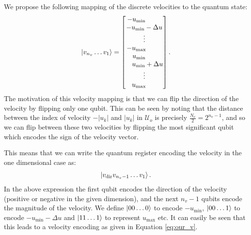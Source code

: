We propose the following mapping of the discrete velocities to the quantum state:
\begin{align}
\ket{v_{n_v} \dots v_1} = 
    \begin{bmatrix}
    -u_{\min} \phantom{\, -\Delta u}\\
    -u_{\min} -\Delta u\\
    \vdots \\
    -u_{\max} \phantom{\, -\Delta u}\\
    \phantom{-}u_{\min} \phantom{\, -\Delta u}\\
    \phantom{\,-}u_{\min} +\Delta u  \\
    \vdots \\
    \phantom{-}u_{\max} \phantom{\, +\Delta u}\\
    \end{bmatrix}.\label{eq:our_v}
\end{align}
The motivation of this velocity mapping is that we can flip the direction of the velocity by flipping only one qubit. This can be seen by noting that the distance between the index of velocity $-|u_k|$ and $|u_k|$ in $\mathcal{U}_o$ is precisely $\frac{N_v}{2} = 2^{n_v-1}$, and so we can flip between these two velocities by flipping the most significant qubit which encodes the sign of the velocity vector.%

This means that we can write the quantum register encoding the velocity in the one dimensional case as: 
\begin{equation}
   \ket{v_{\text{dir}} v_{n_v -1} \dots v_1}.
\end{equation}
In the above expression the first qubit encodes the direction of the velocity (positive or negative in the given dimension), and the next $n_v-1$ qubits encode the magnitude of the velocity. We define $\ket{00 \dots 0}$ to encode $-u_{\min}$, $\ket{00 \dots 1}$ to encode $-u_{\min} - \Delta u$ and $\ket{11 \dots 1}$ to represent $u_{\max}$ etc. It can easily be seen that this leads to a velocity encoding as given in Equation \eqref{eq:our_v}.

